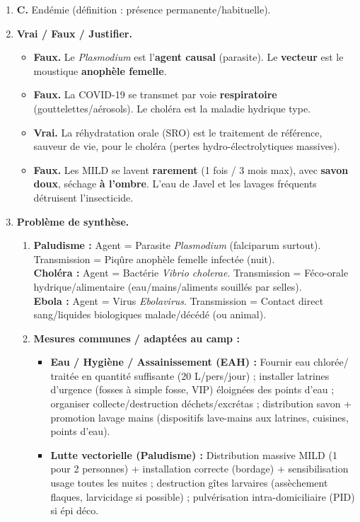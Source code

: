 \documentclass[11pt]{article}
\begin{document}
\begin{corrige}
\begin{enumerate}
\item \textbf{C.} Endémie (définition : présence permanente/habituelle).
\item \textbf{Vrai / Faux / Justifier.}
\begin{itemize}
\item[a)] \textbf{Faux.} Le \emph{Plasmodium} est l'\textbf{agent causal} (parasite). Le \textbf{vecteur} est le moustique \textbf{anophèle femelle}.
\item[b)] \textbf{Faux.} La COVID-19 se transmet par voie \textbf{respiratoire} (gouttelettes/aérosols). Le choléra est la maladie hydrique type.
\item[c)] \textbf{Vrai.} La réhydratation orale (SRO) est le traitement de référence, sauveur de vie, pour le choléra (pertes hydro-électrolytiques massives).
\item[d)] \textbf{Faux.} Les MILD se lavent \textbf{rarement} (1 fois / 3 mois max), avec \textbf{savon doux}, séchage \textbf{à l'ombre}. L'eau de Javel et les lavages fréquents détruisent l'insecticide.
\end{itemize}
\item \textbf{Problème de synthèse.}
\begin{enumerate}
\item \textbf{Paludisme :} Agent = Parasite \emph{Plasmodium} (falciparum surtout). Transmission = Piqûre anophèle femelle infectée (nuit). \\
\textbf{Choléra :} Agent = Bactérie \emph{Vibrio cholerae}. Transmission = Féco-orale hydrique/alimentaire (eau/mains/aliments souillés par selles). \\
\textbf{Ebola :} Agent = Virus \emph{Ebolavirus}. Transmission = Contact direct sang/liquides biologiques malade/décédé (ou animal).
\item \textbf{Mesures communes / adaptées au camp :}
\begin{itemize}
\item \textbf{Eau / Hygiène / Assainissement (EAH) :} Fournir eau chlorée/ traitée en quantité suffisante (20 L/pers/jour) ; installer latrines d'urgence (fosses à simple fosse, VIP) éloignées des points d'eau ; organiser collecte/destruction déchets/excrétas ; distribution savon + promotion lavage mains (dispositifs lave-mains aux latrines, cuisines, points d'eau).
\item \textbf{Lutte vectorielle (Paludisme) :} Distribution massive MILD (1 pour 2 personnes) + installation correcte (bordage) + sensibilisation usage toutes les nuites ; destruction gîtes larvaires (assèchement flaques, larvicidage si possible) ; pulvérisation intra-domiciliaire (PID) si épi déco.

\end{itemize}
\end{enumerate}
\end{enumerate}
\end{corrige}
\end{document}
